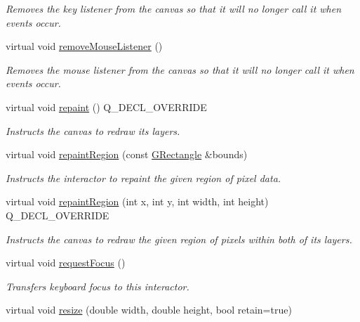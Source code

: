 \begin{DoxyCompactItemize}
\begin{DoxyCompactList}\small\item\em Removes the key listener from the canvas so that it will no longer call it when events occur. \end{DoxyCompactList}\item 
virtual void \mbox{\hyperlink{classGCanvas_aff47f71ce47e688a07c9d38dc92fcc11}{remove\+Mouse\+Listener}} ()
\begin{DoxyCompactList}\small\item\em Removes the mouse listener from the canvas so that it will no longer call it when events occur. \end{DoxyCompactList}\item 
virtual void \mbox{\hyperlink{classGCanvas_ab93427f61c64e3db7f2637519aed1c00}{repaint}} () Q\+\_\+\+D\+E\+C\+L\+\_\+\+O\+V\+E\+R\+R\+I\+DE
\begin{DoxyCompactList}\small\item\em Instructs the canvas to redraw its layers. \end{DoxyCompactList}\item 
virtual void \mbox{\hyperlink{classGDrawingSurface_a769c46fb3e1004aec76e8b0adfa42aa6}{repaint\+Region}} (const \mbox{\hyperlink{classGRectangle}{G\+Rectangle}} \&bounds)
\begin{DoxyCompactList}\small\item\em Instructs the interactor to repaint the given region of pixel data. \end{DoxyCompactList}\item 
virtual void \mbox{\hyperlink{classGCanvas_a52152a764c4c4b092f826eee5d6554aa}{repaint\+Region}} (int x, int y, int width, int height) Q\+\_\+\+D\+E\+C\+L\+\_\+\+O\+V\+E\+R\+R\+I\+DE
\begin{DoxyCompactList}\small\item\em Instructs the canvas to redraw the given region of pixels within both of its layers. \end{DoxyCompactList}\item 
virtual void \mbox{\hyperlink{classGInteractor_a519fb2ac767f8b2febbb50b898b8c8cb}{request\+Focus}} ()
\begin{DoxyCompactList}\small\item\em Transfers keyboard focus to this interactor. \end{DoxyCompactList}\item 
virtual void \mbox{\hyperlink{classGCanvas_a090053938117ab698c4c9c1f1cff74a9}{resize}} (double width, double height, bool retain=true)

\end{DoxyCompactItemize}
